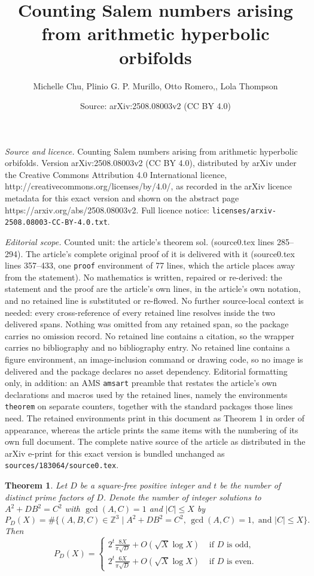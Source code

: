 \documentclass[10pt,a4paper]{amsart}
\title{Counting Salem numbers arising from arithmetic hyperbolic orbifolds}
\author{Michelle Chu, Plinio G. P. Murillo, Otto Romero,, Lola Thompson}
\date{Source: arXiv:2508.08003v2 (CC BY 4.0)}
\newtheorem{theorem}{Theorem}
\newcommand{\Z}{\mathbb{Z}}
\begin{document}
\maketitle

\noindent\emph{Source and licence.} Counting Salem numbers arising from arithmetic hyperbolic orbifolds. Version arXiv:2508.08003v2 (CC BY 4.0), distributed by arXiv under the Creative Commons Attribution 4.0 International licence, http://creativecommons.org/licenses/by/4.0/, as recorded in the arXiv licence metadata for this exact version and shown on the abstract page https://arxiv.org/abs/2508.08003v2. Full licence notice: \texttt{licenses/arxiv-2508.08003-CC-BY-4.0.txt}.\par\smallskip

\noindent\textit{Editorial scope.} Counted unit: the article's theorem sol. (source0.tex lines 285--294). The article's complete original proof of it is delivered with it (source0.tex lines 357--433, one \texttt{proof} environment of 77 lines, which the article places away from the statement). No mathematics is written, repaired or re-derived: the statement and the proof are the article's own lines, in the article's own notation, and no retained line is substituted or re-flowed.  No further source-local context is needed: every cross-reference of every retained line resolves inside the two delivered spans.  Nothing was omitted from any retained span, so the package carries no omission record.  No retained line contains a citation, so the wrapper carries no bibliography and no bibliography entry.  No retained line contains a figure environment, an image-inclusion command or drawing code, so no image is delivered and the package declares no asset dependency.  Editorial formatting only, in addition: an AMS \texttt{amsart} preamble that restates the article's own declarations and macros used by the retained lines, namely the environments \texttt{theorem} on separate counters, together with the standard packages those lines need.  The retained environments print in this document as Theorem 1 in order of appearance, whereas the article prints the same items with the numbering of its own full document.  The complete native source of the article as distributed in the arXiv e-print for this exact version is bundled unchanged as \texttt{sources/183064/source0.tex}.
\begin{theorem}\label{th:diop. sol.}
    Let $D$ be a square-free positive integer and $t$ be the number of distinct prime factors of $D$. Denote the number of integer solutions to $A^2+DB^2=C^2$ with $\gcd(A,C)=1$ and $|C|\leq X$ by
    \[ P_D(X)=\#\{(A,B,C)\in \Z^{3}\mid A^2+DB^2=C^2, \, \gcd(A,C)=1,  \text{  and  } |C|\leq X\}.
    \]
    Then
    \[ P_D(X) = \begin{cases}
    2^{t}\frac{8X}{\pi\sqrt{D}} + O(\sqrt{X}\log X)   &\text{ if $D$ is odd},\\
    2^{t}\frac{6X}{\pi\sqrt{D}} + O(\sqrt{X}\log X)   &\text{ if $D$ is even} .
    \end{cases} \]
\end{theorem}
\end{document}

